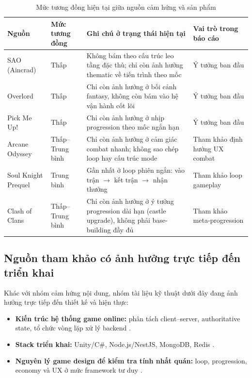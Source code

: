\begin{table}[H]
\centering
\renewcommand{\arraystretch}{1.2}
\setlength{\tabcolsep}{6pt}
\begin{tabularx}{\textwidth}{|L{3.3cm}|L{2.0cm}|Y|L{3.2cm}|}
\hline
\textbf{Nguồn} & \textbf{Mức tương đồng} & \textbf{Ghi chú ở trạng thái hiện tại} & \textbf{Vai trò trong báo cáo} \\
\hline
SAO (Aincrad) \cite{sao-aincrad} & Thấp & Không bám theo cấu trúc leo tầng đặc thù; chỉ còn ảnh hưởng thematic về tiến trình theo mốc & Ý tưởng ban đầu \\
\hline
Overlord \cite{overlord-novel} & Thấp & Chỉ còn ảnh hưởng ở bối cảnh fantasy, không còn bám vào hệ vận hành cốt lõi & Ý tưởng ban đầu \\
\hline
Pick Me Up! \cite{pickmeup-webtoon} & Thấp & Chỉ còn ảnh hưởng ở nhịp progression theo mốc ngắn hạn & Ý tưởng ban đầu \\
\hline
Arcane Odyssey \cite{arcane-odyssey} & Thấp--Trung bình & Chỉ còn ảnh hưởng ở cảm giác combat nhanh; không sao chép loop hay cấu trúc mode & Tham khảo định hướng UX combat \\
\hline
Soul Knight Prequel \cite{soulknight-prequel} & Trung bình & Gần nhất ở loop phiên ngắn: vào trận $\rightarrow$ kết trận $\rightarrow$ nhận thưởng & Tham khảo loop gameplay \\
\hline
Clash of Clans \cite{clashofclans} & Thấp--Trung bình & Chỉ còn ảnh hưởng ở ý tưởng progression dài hạn (castle upgrade), không phải base-building đầy đủ & Tham khảo meta-progression \\
\hline
\end{tabularx}
\caption{Mức tương đồng hiện tại giữa nguồn cảm hứng và sản phẩm}
\label{tab:rw-current-fit}
\end{table}

\subsection{Nguồn tham khảo có ảnh hưởng trực tiếp đến triển khai}
\label{subsec:rw-technical}

Khác với nhóm cảm hứng nội dung, nhóm tài liệu kỹ thuật dưới đây đang ảnh hưởng trực tiếp đến thiết kế và hiện thực:
\begin{itemize}
    \item \textbf{Kiến trúc hệ thống game online:} phân tách client--server, authoritative state, tổ chức vòng lặp xử lý backend \cite{gregory-engine,moriarty-networked,gaffer-networking}.
    \item \textbf{Stack triển khai:} Unity/C\#, Node.js/NestJS, MongoDB, Redis \cite{unity-manual,nest-docs,nodejs-docs,mongodb-guide,redis-in-action}.
    \item \textbf{Nguyên lý game design để kiểm tra tính nhất quán:} loop, progression, economy và UX ở mức framework tư duy \cite{schell-art,adams-game-design}.
\end{itemize}

